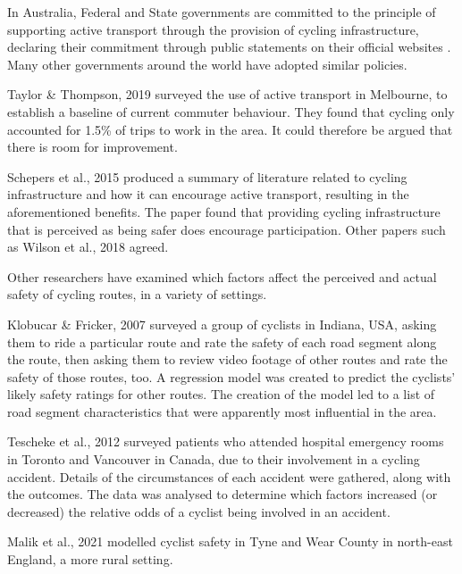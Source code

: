 \documentclass[11pt,twoside]{report}
\begin{document}
In Australia, Federal and State governments are committed to the principle of supporting active transport through the provision of cycling infrastructure, declaring their commitment through public statements on their official websites \cite{federal_policy_2019} \cite{state_policy_2020}.  Many other governments around the world have adopted similar policies.

Taylor \& Thompson, 2019 \cite{melbactive} surveyed the use of active transport in Melbourne, to establish a baseline of current commuter behaviour.  They found that cycling only accounted for 1.5\% of trips to work in the area.  It could therefore be argued that there is room for improvement.

Schepers et al., 2015 \cite{SCHEPERS2015460} produced a summary of literature related to cycling infrastructure and how it can encourage active transport, resulting in the aforementioned benefits.  The paper found that providing cycling infrastructure that is perceived as being safer does encourage participation.  Other papers such as Wilson et al., 2018 \cite{WILSON2018234} agreed.

Other researchers have examined which factors affect the perceived and actual safety of cycling routes, in a variety of settings.

Klobucar \& Fricker, 2007 \cite{BIKESAFETY} surveyed a group of cyclists in Indiana, USA, asking them to ride a particular route and rate the safety of each road segment along the route, then asking them to review video footage of other routes and rate the safety of those routes, too.  A regression model was created to predict the cyclists' likely safety ratings for other routes.  The creation of the model led to a list of road segment characteristics that were apparently most influential in the area.

Tescheke et al., 2012 \cite{Teschke2012} surveyed patients who attended hospital emergency rooms in Toronto and Vancouver in Canada, due to their involvement in a cycling accident.  Details of the circumstances of each accident were gathered, along with the outcomes.  The data was analysed to determine which factors increased (or decreased) the relative odds of a cyclist being involved in an accident.

Malik et al., 2021 \cite{Malik2021} modelled cyclist safety in Tyne and Wear County in north-east England, a more rural setting.
\end{document}
